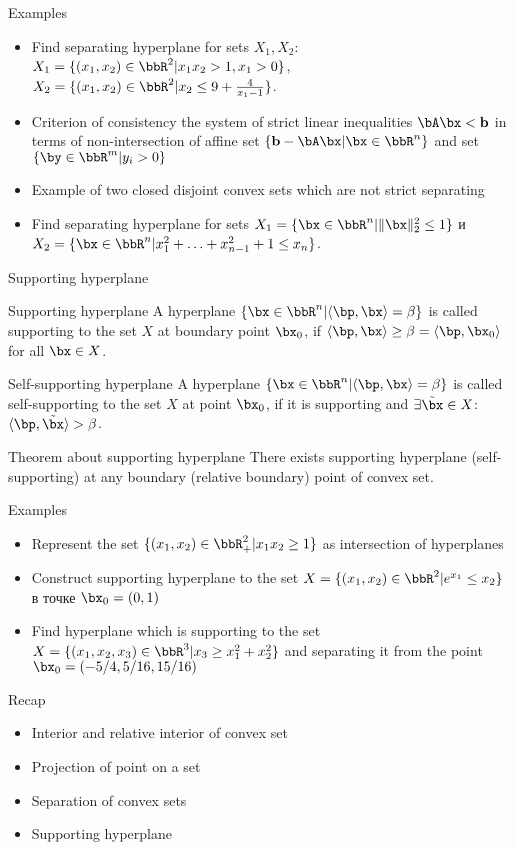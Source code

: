 \documentclass[12pt]{beamer}
\begin{document}
\begin{frame}{Examples}
\begin{itemize}
\item Find separating hyperplane for sets $X_1, X_2$: $X_1 = \{ (x_1, x_2) \in \bbR^2 | x_1x_2 > 1, x_1 > 0 \}$, $X_2 = \{ (x_1, x_2) \in \bbR^2 |  x_2 \leq 9 + \frac{4}{x_1 - 1} \}$.
\item Criterion of consistency the system of strict linear inequalities  $\bA\bx < \mathbf{b}$ in terms of non-intersection of affine set $\{\mathbf{b} - \bA\bx | \bx \in \bbR^n \}$ and set $\{ \by \in \bbR^m | y_i > 0 \}$ 
\item Example of two closed disjoint convex sets which are not strict separating
\item Find separating hyperplane for sets $X_1 = \{ \bx \in \bbR^n | \| \bx \|^2_2 \leq 1 \}$ и $X_2 = \{ \bx \in \bbR^n | x_1^2 + \ldots + x_{n-1}^2 + 1 \leq x_n \}$.
\end{itemize}
\end{frame}

\begin{frame}{Supporting hyperplane}
\begin{block}{Supporting hyperplane}
A hyperplane $\{ \bx \in \bbR^n | \langle \bp, \bx \rangle = \beta \}$ is called supporting to the set $X$ at boundary point $\bx_0$, if $\langle \bp, \bx \rangle \geq \beta = \langle \bp, \bx_0 \rangle$ for all $\bx \in X$.
\end{block}

\begin{block}{Self-supporting hyperplane}
A hyperplane $\{ \bx \in \bbR^n | \langle \bp, \bx \rangle = \beta \}$ is called self-supporting to the set $X$ at point $\bx_0$, if it is supporting and $\exists \tilde{\bx} \in X$: $\langle \bp, \tilde{\bx} \rangle > \beta$.
\end{block}

\begin{block}{Theorem about supporting hyperplane}
There exists supporting hyperplane (self-supporting) at any boundary (relative boundary) point of convex set.
\end{block}
\end{frame}


\begin{frame}{Examples}
\begin{itemize}
\item Represent the set $\{ (x_1, x_2) \in \bbR_+^2| x_1x_2 \geq 1\}$ as intersection of hyperplanes
\item Construct supporting hyperplane to the set $X = \{ (x_1, x_2) \in \bbR^2 | e^{x_1} \leq x_2 \}$ в точке $\bx_0 = (0, 1)$
\item Find hyperplane which is supporting to the set $X = \{ (x_1, x_2, x_3) \in \bbR^3 | x_3 \geq x_1^2 + x_2^2 \}$ and separating it from the point $\bx_0 = (-5/4, 5 / 16, 15/16)$
\end{itemize}
\end{frame}


\begin{frame}{Recap}
\begin{itemize}
\item Interior and relative interior of convex set
\item Projection of point on a set
\item Separation of convex sets
\item Supporting hyperplane 
\end{itemize}
\end{frame}
\end{document}
